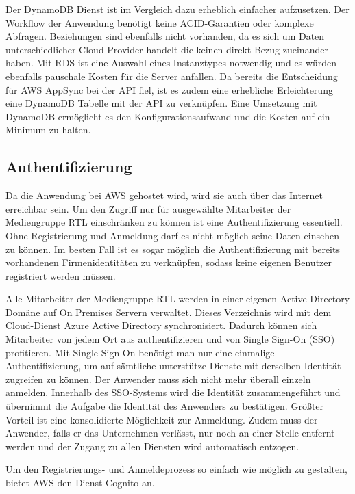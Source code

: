 {Der DynamoDB Dienst ist im Vergleich dazu erheblich einfacher aufzusetzen.
Der Workflow der Anwendung benötigt keine ACID-Garantien oder komplexe Abfragen. Beziehungen sind ebenfalls nicht vorhanden, da es sich um Daten unterschiedlicher
Cloud Provider handelt die keinen direkt Bezug zueinander haben.
Mit RDS ist eine Auswahl eines Instanztypes notwendig und es würden ebenfalls pauschale Kosten für die Server anfallen.
Da bereits die Entscheidung für AWS AppSync bei der API fiel, ist es zudem eine erhebliche Erleichterung eine DynamoDB Tabelle mit der API zu verknüpfen.
Eine Umsetzung mit DynamoDB ermöglicht es den Konfigurationsaufwand und die Kosten auf ein Minimum zu halten.


\subsection{Authentifizierung}

Da die Anwendung bei AWS gehostet wird, wird sie auch über das Internet erreichbar sein.
Um den Zugriff nur für ausgewählte Mitarbeiter der Mediengruppe RTL einschränken zu können ist eine Authentifizierung essentiell.
Ohne Registrierung und Anmeldung darf es nicht möglich seine Daten einsehen zu können.
Im besten Fall ist es sogar möglich die Authentifizierung mit bereits vorhandenen Firmenidentitäten zu verknüpfen, sodass keine eigenen
Benutzer registriert werden müssen.

Alle Mitarbeiter der Mediengruppe RTL werden in einer eigenen Active Directory Domäne auf On Premises Servern verwaltet.
Dieses Verzeichnis wird mit dem Cloud-Dienst Azure Active Directory synchronisiert.
Dadurch können sich Mitarbeiter von jedem Ort aus authentifizieren und von Single Sign-On (SSO) profitieren.
Mit Single Sign-On benötigt man nur eine einmalige Authentifizierung, um auf sämtliche unterstütze Dienste mit derselben Identität zugreifen zu können.
Der Anwender muss sich nicht mehr überall einzeln anmelden.
Innerhalb des SSO-Systems wird die Identität zusammengeführt und übernimmt die Aufgabe die Identität des Anwenders zu bestätigen.
Größter Vorteil ist eine konsolidierte Möglichkeit zur Anmeldung. Zudem muss der Anwender, falls er das Unternehmen verlässt, nur noch an einer Stelle entfernt werden und der Zugang zu allen Diensten wird automatisch entzogen.

Um den Registrierungs- und Anmeldeprozess so einfach wie möglich zu gestalten, bietet AWS den Dienst Cognito an.

}
